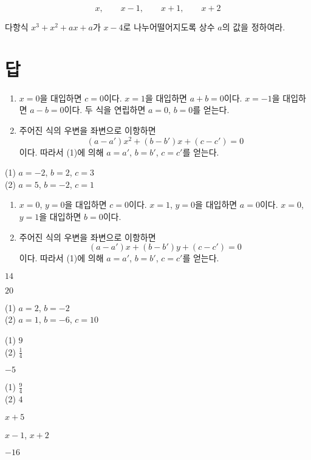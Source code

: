 \documentclass{oblivoir}
\begin{document}
%
\begin{mdframed}[skipabove=-10pt,innertopmargin=-3pt,leftmargin=60pt,rightmargin=60pt]
\[x,\qquad x-1,\qquad x+1,\qquad x+2\]
\end{mdframed}

%
\prob{}
다항식 \(x^3+x^2+ax+a\)가 \(x-4\)로 나누어떨어지도록 상수 \(a\)의 값을 정하여라.



\section*{답}

\begin{mdframed}
\begin{enumerate}[(1)]
\item
\(x=0\)을 대입하면 \(c=0\)이다.
\(x=1\)을 대입하면 \(a+b=0\)이다.
\(x=-1\)을 대입하면 \(a-b=0\)이다.
두 식을 연립하면 \(a=0\), \(b=0\)를 얻는다.
\item
주어진 식의 우변을 좌변으로 이항하면 \[(a-a')x^2+(b-b')x+(c-c')=0\]이다.
따라서 (1)에 의해 \(a=a'\), \(b=b'\), \(c=c'\)를 얻는다.
\end{enumerate}
\end{mdframed}

%
(1) \(a=-2\), \(b=2\), \(c=3\)\\
(2) \(a=5\), \(b=-2\), \(c=1\)

\begin{mdframed}
\begin{enumerate}[(1)]
\item
\(x=0\), \(y=0\)을 대입하면 \(c=0\)이다.
\(x=1\), \(y=0\)을 대입하면 \(a=0\)이다.
\(x=0\), \(y=1\)을 대입하면 \(b=0\)이다.
\item
주어진 식의 우변을 좌변으로 이항하면 \[(a-a')x+(b-b')y+(c-c')=0\]이다.
따라서 (1)에 의해 \(a=a'\), \(b=b'\), \(c=c'\)를 얻는다.
\end{enumerate}
\end{mdframed}

\begin{minipage}{0.49\textwidth}
%
\(14\)

%
\(20\)

%
(1) \(a=2\), \(b=-2\)\\
(2) \(a=1\), \(b=-6\), \(c=10\)

%
(1) \(9\)\\
(2) \(\frac14\)

%
\(-5\)

%
(1) \(\frac94\)\\
(2) \(4\)

%
\(x+5\)

%
\(x-1\), \(x+2\)

%
\(-16\)

\end{minipage}
\end{document}
